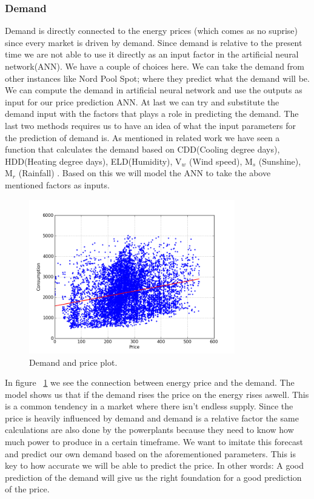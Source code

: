 \subsubsection{Demand}
Demand is directly connected to the energy prices (which comes as no suprise) since every market is driven by demand. Since demand is relative to the present time we are not able to use it directly as an input factor in the artificial neural network(ANN). We have a couple of choices here. We can take the demand from other instances like Nord Pool Spot; where they predict what the demand will be. We can compute the demand in artificial neural network and use the outputs as input for our price prediction ANN. At last we can try and substitute the demand input with the factors that plays a role in predicting the demand. The last two methods requires us to have an idea of what the input parameters for the prediction of demand is. As mentioned in related work we have seen a function that calculates the demand based on CDD(Cooling degree days), HDD(Heating degree days), ELD(Humidity), V$_w$ (Wind speed), M$_s$ (Sunshine), M$_r$ (Rainfall) \cite{19}. Based on this we will model the ANN to take the above mentioned factors as inputs.

\begin{figure}[H]
\centering
\includegraphics[width=0.8\textwidth ,natwidth=410,natheight=237]{billeder/energy_price_plots/consump_price.png}
\caption{Demand and price plot.}
\label{fig:consump_price}
\end{figure}

In figure ~\ref{fig:consump_price} we see the connection between energy price and the demand. The model shows us that if the demand rises the price on the energy rises aswell. This is a common tendency in a market where there isn't endless supply. Since the price is heavily influenced by demand and demand is a relative factor the same calculations are also done by the powerplants because they need to know how much power to produce in a certain timeframe. We want to imitate this forecast and predict our own demand based on the aforementioned parameters. This is key to how accurate we will be able to predict the price. In other words: A good prediction of the demand will give us the right foundation for a good prediction of the price.

